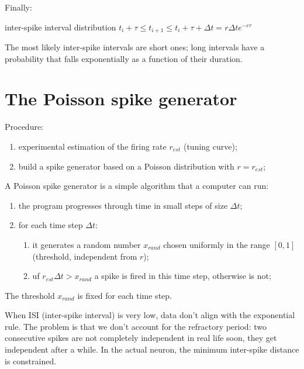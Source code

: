 \documentclass[12pt]{article}
\begin{document}
Finally:

\begin{center}
	inter-spike interval distribution
	$t_i + \tau \leq t_{i+1} \leq t_i + \tau + \Delta t = r \Delta t e^{-r \tau}$
\end{center}

The most likely inter-spike intervals are short ones; long intervals have a probability that falls exponentially as a function of their duration.

\section{The Poisson spike generator}

Procedure:

\begin{enumerate}
    \item experimental estimation of the firing rate $r_{est}$ (tuning curve);
    \item build a spike generator based on a Poisson distribution with $r = r_{est}$;
\end{enumerate}

\vspace{20px}

\noindent
A Poisson spike generator is a simple algorithm that a computer can run:

\renewcommand{\labelenumii}{\theenumii}
\renewcommand{\theenumii}{\theenumi.\arabic{enumii}.}

\begin{enumerate}
    \item the program progresses through time in small steps of size $\Delta t$;
    \item for each time step $\Delta t$:
    \begin{enumerate}
        \item it generates a random number $x_{rand}$ chosen uniformly in the range $[0, 1]$ (threshold, independent from $r$);
        \item uf $r_{est} \Delta t > x_{rand}$ a spike is fired in this time step, otherwise is not;
    \end{enumerate}
\end{enumerate}

The threshold $x_{rand}$ is fixed for each time step.

\vspace{20px}

When ISI (inter-spike interval) is very low, data don't align with the exponential rule. The problem is that we don't account for the refractory period: two consecutive spikes are not completely independent in real life soon, they get independent after a while. In the actual neuron, the minimum inter-spike distance is constrained.
\end{document}
